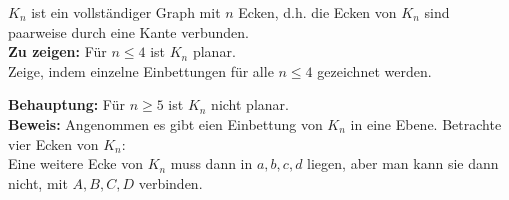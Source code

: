 \begin{problem*}[2a]
$K_n$ ist ein vollständiger Graph mit $ n $ Ecken, d.h. die Ecken von $ K_n $ sind paarweise durch eine Kante verbunden.\\
\textbf{Zu zeigen:} Für $n \leq 4$ ist $ K_n $ planar.\\
Zeige, indem einzelne Einbettungen für alle $ n \leq 4 $ gezeichnet werden.\\
\end{problem*}

\begin{problem*}[2b]
\textbf{Behauptung:} Für $n \geq 5$ ist $ K_n $ nicht planar.\\
\textbf{Beweis:} Angenommen es gibt eien Einbettung von $ K_n $ in eine Ebene. Betrachte vier Ecken von $ K_n $:\\
Eine weitere Ecke von $ K_n $ muss dann in $ a,b,c,d  $ liegen, aber man kann sie dann nicht, mit $ A, B, C, D $ verbinden.
\end{problem*}

